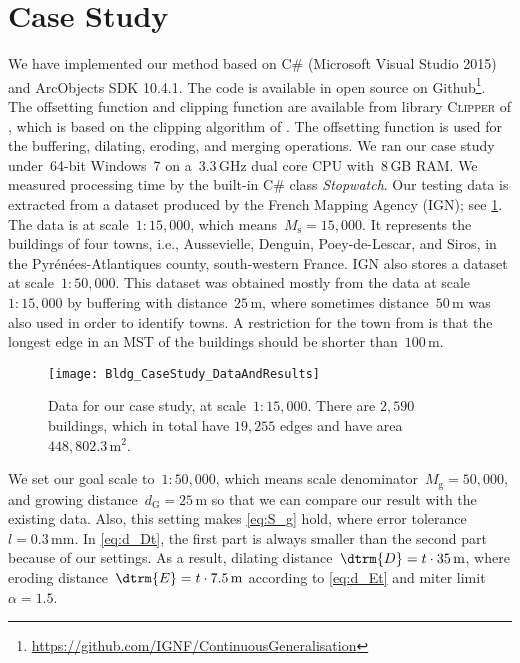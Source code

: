 \section{Case Study}
\label{sec:CaseStudy}
We have implemented our method based on
C\# (Microsoft Visual Studio 2015) and ArcObjects SDK 10.4.1. 
The code is available in open source on 
Github\footnote{\url{
https://github.com/IGNF/ContinuousGeneralisation}}.
The offsetting function and clipping function 
are available from library \textsc{Clipper} of 
\citet{Johnson2014}, which is based on the clipping algorithm of
\citet{Vatti1992Clip}.
The offsetting function is used for the buffering, dilating, 
eroding, and merging operations.
We ran our case study under~64-bit 
Windows~7 on a~$3.3\,$GHz dual core CPU with~$8\,$GB RAM.
We measured processing time by the built-in C\# class 
\emph{Stopwatch}.
Our testing data is extracted from a dataset produced 
by the French Mapping Agency (IGN);
see \fig\ref{fig:Data}.
The data is at scale~$1:15{,}000$, 
which means~$M_\mathrm{s}=15{,}000$.
It represents the buildings of four towns, 
i.e., Aussevielle, Denguin,  Poey-de-Lescar, and Siros, 
in the Pyr\'en\'ees-Atlantiques county, south-western France.
IGN also stores a dataset at scale~$1:50{,}000$.
This dataset was obtained mostly
from the data at scale~$1:15{,}000$ 
by buffering with distance~$25\,\mathrm{m}$,
where sometimes distance~$50\,\mathrm{m}$ was also used
in order to identify towns.
A restriction for the town from \citet{Boffet2000} is that 
the longest edge in an MST of the buildings 
should be shorter than~$100\,\mathrm{m}$.

\begin{figure}[tb]
	\centering
	\texttt{[image: Bldg\_CaseStudy\_DataAndResults]}
	\caption{Data for our case study, at scale~$1:15{,}000$.
		There are $2{,}590$ buildings, 
		which in total have $19{,}255$ edges and have area
		$448{,}802.3\,\mathrm{m}^2$.}
	\label{fig:Data}
\end{figure}

We set our goal scale to~$1:50{,}000$, 
which means scale denominator~$M_\mathrm{g}=50{,}000$,
and growing distance~$d_\mathrm{G}=25\,\mathrm{m}$
so that we can compare our result with the existing data.
Also, this setting makes \eq\ref{eq:S_g} hold, 
where error tolerance~$l=0.3\,\mathrm{mm}$.
In \eq\ref{eq:d_Dt}, the first part is always smaller than 
the second part because of our settings.
As a result, dilating distance~$\dtrm{D}=t\cdot 35\,\mathrm{m}$, 
where eroding distance~$\dtrm{E}=t\cdot 7.5\,\mathrm{m}$ 
according to \eq\ref{eq:d_Et} and miter limit~$\alpha=1.5$.

